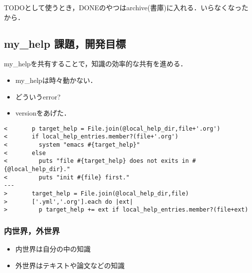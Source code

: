 \documentclass[a4j,twocolumn]{jsarticle}
\begin{document}
TODOとして使うとき，DONEのやつはarchive(書庫)に入れる．いらなくなったから．

\subsection{my\_help 課題，開発目標}
\label{sec-2-4}
my\_helpを共有することで，知識の効率的な共有を進める．

\begin{itemize}
\item my\_helpは時々動かない．
\item どういうerror?
\item versionをあげた．
\end{itemize}
\begin{verbatim}
<       p target_help = File.join(@local_help_dir,file+'.org')
<       if local_help_entries.member?(file+'.org')
<         system "emacs #{target_help}"
<       else
<         puts "file #{target_help} does not exits in #{@local_help_dir}."
<         puts "init #{file} first."
---
>       target_help = File.join(@local_help_dir,file)
>       ['.yml','.org'].each do |ext|
>         p target_help += ext if local_help_entries.member?(file+ext)
\end{verbatim}



\subsubsection*{内世界，外世界}
\label{sec-2-5-1}
\begin{itemize}
\item 内世界は自分の中の知識

\item 外世界はテキストや論文などの知識
\end{itemize}
\end{document}
